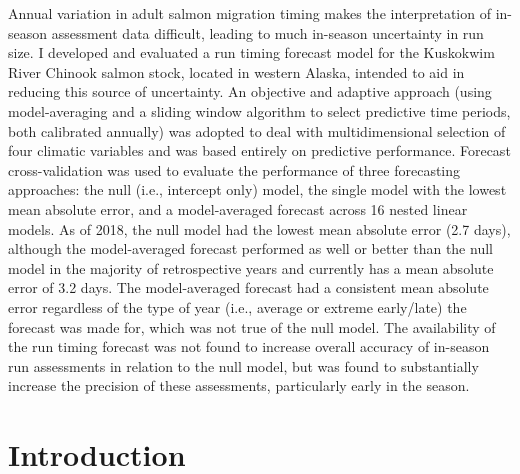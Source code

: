\documentclass[12pt,]{book}
\theoremstyle{definition}
\theoremstyle{definition}
\theoremstyle{definition}
\theoremstyle{remark}
\begin{document}
Annual variation in adult salmon migration timing makes the
interpretation of in-season assessment data difficult, leading to much
in-season uncertainty in run size. I developed and evaluated a run
timing forecast model for the Kuskokwim River Chinook salmon stock,
located in western Alaska, intended to aid in reducing this source of
uncertainty. An objective and adaptive approach (using model-averaging
and a sliding window algorithm to select predictive time periods, both
calibrated annually) was adopted to deal with multidimensional selection
of four climatic variables and was based entirely on predictive
performance. Forecast cross-validation was used to evaluate the
performance of three forecasting approaches: the null (i.e., intercept
only) model, the single model with the lowest mean absolute error, and a
model-averaged forecast across 16 nested linear models. As of 2018, the
null model had the lowest mean absolute error (2.7 days), although the
model-averaged forecast performed as well or better than the null model
in the majority of retrospective years and currently has a mean absolute
error of 3.2 days. The model-averaged forecast had a consistent mean
absolute error regardless of the type of year (i.e., average or extreme
early/late) the forecast was made for, which was not true of the null
model. The availability of the run timing forecast was not found to
increase overall accuracy of in-season run assessments in relation to
the null model, but was found to substantially increase the precision of
these assessments, particularly early in the season.

\section{Introduction}\label{introduction}
\end{document}
